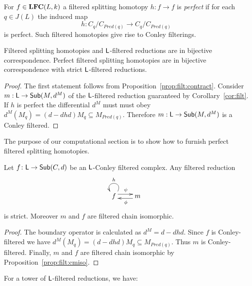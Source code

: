 For $f\in {\bf LFC}(L,k)$ a filtered splitting homotopy $h:f\to f$ is {\em perfect} if for each $q\in J(L)$ the induced map $$h:C_q/C_{Pred(q)}\to C_q/C_{Pred(q)}$$ is perfect.  Such filtered homotopies give rise to Conley filterings.

\begin{cor}\label{cor:filt}
Filtered splitting homotopies and ${\mathsf L}$-filtered reductions are in bijective correspondence.  Perfect filtered splitting homotopies are in bijective correspondence with strict ${\mathsf L}$-filtered reductions.
\end{cor}
\begin{proof}
 The first statement follows from Proposition~\ref{prop:filt:contract}.  Consider $m:{\mathsf L}\to \mathsf{Sub}(M,d^M)$ of the ${\mathsf L}$-filtered reduction guaranteed by Corollary~\ref{cor:filt}.  If $h$ is perfect the differential $d^M$ must must obey $d^M(M_q) = (d-dhd)M_q\subseteq M_{Pred(q)}$.  Therefore $m:{\mathsf L}\to \mathsf{Sub}(M,d^M)$ is a Conley filtered.
\end{proof}


The purpose of our computational section is to show how to furnish perfect filtered splitting homotopies.  


\begin{prop}
Let $f\colon{\mathsf L}\to \mathsf{Sub}(C,d)$ be an ${\mathsf L}$-Conley filtered complex.  Any filtered reduction
\[
\xymatrixrowsep{0.03in}
\xymatrixcolsep{0.3in}
\xymatrix{
f \ar@(ur,ul)_{h}  \ar[r]<3pt>^{\psi} & \ar[l]<3pt>^{\phi} m
}
\]
is strict.  Moreover $m$ and $f$ are filtered chain isomorphic.
\end{prop}
\begin{proof}
 The boundary operator is calculated as $d^M= d-dhd$.  Since $f$ is Conley-filtered  we have $d^M(M_q) = (d-dhd)M_q\subseteq M_{Pred(q)}$.  Thus $m$ is Conley-filtered.  Finally, $m$ and $f$ are filtered chain isomorphic by Proposition~\ref{prop:filt:cmiso}.
\end{proof}

For a tower of ${\mathsf L}$-filtered reductions, we have:




